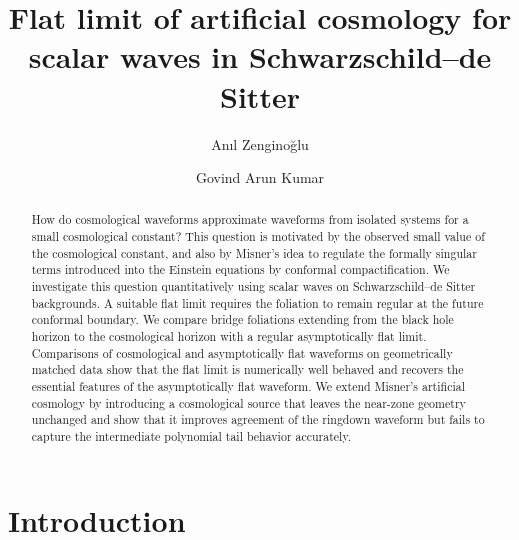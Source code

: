 \documentclass[
 aps,
 prd,
 reprint,
 superscriptaddress,
 nofootinbib,
 longbibliography
]{revtex4-2}
\begin{document}
\title{Flat limit of artificial cosmology for scalar waves in Schwarzschild--de Sitter}

\author{An\i l Zengino\u{g}lu}

\author{Govind Arun Kumar}

\begin{abstract}
How do cosmological waveforms approximate waveforms from isolated systems for a small cosmological constant? This question is motivated by the observed small value of the cosmological constant, and also by Misner's idea to regulate the formally singular terms introduced into the Einstein equations by conformal compactification. We
investigate this question quantitatively using scalar waves on Schwarzschild--de Sitter backgrounds. A suitable flat limit requires the foliation to remain regular at the future conformal boundary. We compare bridge foliations extending from the black hole horizon to the cosmological horizon with a regular asymptotically flat limit. Comparisons of cosmological and asymptotically flat waveforms on geometrically matched data show that the flat limit is numerically well behaved and recovers the essential features of the asymptotically flat waveform. We extend Misner's artificial cosmology by introducing a cosmological source that leaves the near-zone geometry unchanged and show that it improves agreement of the ringdown waveform but fails to capture the intermediate polynomial tail behavior accurately.
\end{abstract}

\maketitle
\raggedbottom

\section{Introduction}
\label{sec:introduction}
\end{document}
